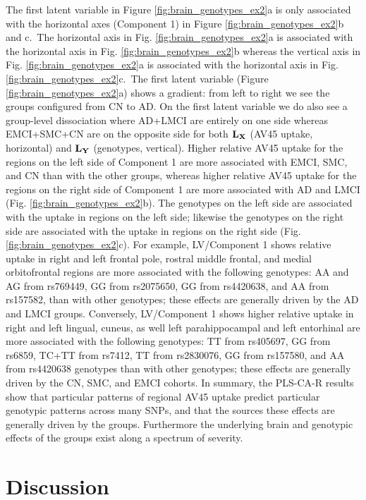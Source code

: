 \documentclass[12pt]{article}
\begin{document}
The first latent variable in Figure \ref{fig:brain_genotypes_ex2}a is
only associated with the horizontal axes (Component 1) in Figure
\ref{fig:brain_genotypes_ex2}b and c.~The horizontal axis in Fig.
\ref{fig:brain_genotypes_ex2}a is associated with the horizontal axis in
Fig. \ref{fig:brain_genotypes_ex2}b whereas the vertical axis in Fig.
\ref{fig:brain_genotypes_ex2}a is associated with the horizontal axis in
Fig. \ref{fig:brain_genotypes_ex2}c.~The first latent variable (Figure
\ref{fig:brain_genotypes_ex2}a) shows a gradient: from left to right we
see the groups configured from CN to AD. On the first latent variable we
do also see a group-level dissociation where AD+LMCI are entirely on one
side whereas EMCI+SMC+CN are on the opposite side for both
\({\bf L}_{\bf X}\) (AV45 uptake, horizontal) and \({\bf L}_{\bf Y}\)
(genotypes, vertical). Higher relative AV45 uptake for the regions on
the left side of Component 1 are more associated with EMCI, SMC, and CN
than with the other groups, whereas higher relative AV45 uptake for the
regions on the right side of Component 1 are more associated with AD and
LMCI (Fig. \ref{fig:brain_genotypes_ex2}b). The genotypes on the left
side are associated with the uptake in regions on the left side;
likewise the genotypes on the right side are associated with the uptake
in regions on the right side (Fig. \ref{fig:brain_genotypes_ex2}c). For
example, LV/Component 1 shows relative uptake in right and left frontal
pole, rostral middle frontal, and medial orbitofrontal regions are more
associated with the following genotypes: AA and AG from rs769449, GG
from rs2075650, GG from rs4420638, and AA from rs157582, than with other
genotypes; these effects are generally driven by the AD and LMCI groups.
Conversely, LV/Component 1 shows higher relative uptake in right and
left lingual, cuneus, as well left parahippocampal and left entorhinal
are more associated with the following genotypes: TT from rs405697, GG
from rs6859, TC+TT from rs7412, TT from rs2830076, GG from rs157580, and
AA from rs4420638 genotypes than with other genotypes; these effects are
generally driven by the CN, SMC, and EMCI cohorts. In summary, the
PLS-CA-R results show that particular patterns of regional AV45 uptake
predict particular genotypic patterns across many SNPs, and that the
sources these effects are generally driven by the groups. Furthermore
the underlying brain and genotypic effects of the groups exist along a
spectrum of severity.

\hypertarget{discussion}{%
\section{Discussion}\label{discussion}}
\end{document}
